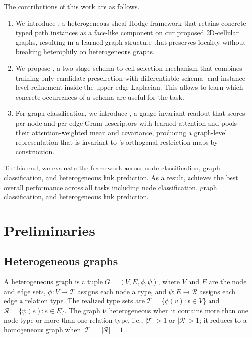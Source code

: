 The contributions of this work are as follows.
\begin{enumerate}
  \item We introduce \method{}, a heterogeneous sheaf-Hodge framework that retains concrete typed
  path instances as a face-like component on our proposed 2D-cellular graphs, resulting in a learned graph structure that preserves locality without breaking heterophily on heterogeneous graphs.
  \item We propose \ampss{}, a two-stage schema-to-cell selection mechanism that combines
  training-only candidate preselection with differentiable schema- and instance-level refinement
  inside the upper edge Laplacian. This allows \method{} to learn which concrete occurrences
  of a schema are useful for the task.
  \item For graph classification, we introduce \sheafconvpool{}, a gauge-invariant readout that
  scores per-node and per-edge Gram descriptors with learned attention and pools their
  attention-weighted mean and covariance, producing a graph-level representation that is
  invariant to \method{}'s orthogonal restriction maps by construction.
\end{enumerate}

To this end, we evaluate the framework across node classification, graph classification, and
heterogeneous link prediction. As a result, \method{} achieves the best overall performance across all tasks including node classification, graph classification, and heterogeneous link prediction.

\section{Preliminaries}
\label{sec:background}


\subsection{Heterogeneous graphs}

A heterogeneous graph is a tuple $G=(V,E,\phi,\psi)$, where $V$ and $E$ are the node and edge
sets, $\phi:V\rightarrow\mathcal{T}$ assigns each node a type, and
$\psi:E\rightarrow\mathcal{R}$ assigns each edge a relation type. The realized type sets are
$\mathcal{T}=\{\phi(v):v\in V\}$ and $\mathcal{R}=\{\psi(e):e\in E\}$. The graph is heterogeneous
when it contains more than one node type or more than one relation type, i.e.,
$|\mathcal{T}|>1$ or $|\mathcal{R}|>1$; it reduces to a homogeneous graph when
$|\mathcal{T}|=|\mathcal{R}|=1$ \cite{lu2026addressing}.

